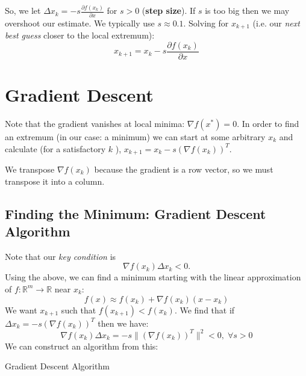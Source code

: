So, we let \(\Delta x_k = -s \frac{\partial f(x_k)}{\partial x} \) for \(s>0\) (\textbf{step size}). If \(s\) is too big then we may overshoot our estimate. We typically use \(s \approx 0.1\). Solving for \(x_{k+1}\) (i.e. our \emph{next best guess} closer to the local extremum):
\[
  x_{k+1} = x_k -s \frac{\partial f(x_k)}{\partial x} 
\]

\section{Gradient Descent}
Note that the gradient vanishes at local minima: \(\nabla f(x^*) = 0\). In order to find an extremum (in our case: a minimum) we can start at some arbitrary \(x_k\) and calculate (for a satisfactory \(k\) ), \(x_{k+1} = x_k - s(\nabla f(x_k))^T\).

\begin{remark}
  We transpose \(\nabla f(x_k)\) because the gradient is a row vector, so we must transpose it into a column.
\end{remark}

\subsection*{Finding the Minimum: Gradient Descent Algorithm}
Note that our \emph{key condition} is
\[
  \nabla f(x_k) \Delta x_k < 0.
\]
Using the above, we can find a minimum starting with the linear approximation of \(f: \mathbb{R} ^m \to \mathbb{R} \) near \(x_k\):
\[
  f(x) \approx f(x_k) + \nabla f(x_k)(x-x_k)
\]
We want \(x_{k+1}\) such that \(f(x_{k+1}) < f(x_k)\). We find that if \(\Delta x_k = -s(\nabla f(x_k))^T\) then we have:
\[
  \nabla f(x_k) \Delta x_k = -s \lVert (\nabla f(x_k))^T \rVert^2 < 0, \; \forall s > 0
\]
We can construct an algorithm from this:
\begin{algorithm}
  \DontPrintSemicolon
  \caption{Gradient Descent Algorithm}
\end{algorithm}